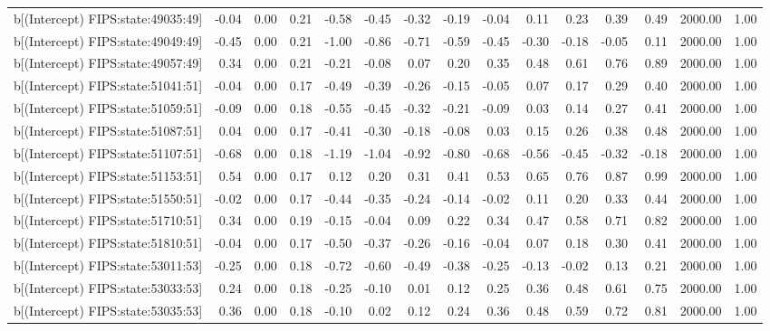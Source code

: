 \begin{table}[ht]
\begin{tabular}{rrrrrrrrrrrrrrr}
  b[(Intercept) FIPS:state:49035:49] & -0.04 & 0.00 & 0.21 & -0.58 & -0.45 & -0.32 & -0.19 & -0.04 & 0.11 & 0.23 & 0.39 & 0.49 & 2000.00 & 1.00 \\ 
  b[(Intercept) FIPS:state:49049:49] & -0.45 & 0.00 & 0.21 & -1.00 & -0.86 & -0.71 & -0.59 & -0.45 & -0.30 & -0.18 & -0.05 & 0.11 & 2000.00 & 1.00 \\ 
  b[(Intercept) FIPS:state:49057:49] & 0.34 & 0.00 & 0.21 & -0.21 & -0.08 & 0.07 & 0.20 & 0.35 & 0.48 & 0.61 & 0.76 & 0.89 & 2000.00 & 1.00 \\ 
  b[(Intercept) FIPS:state:51041:51] & -0.04 & 0.00 & 0.17 & -0.49 & -0.39 & -0.26 & -0.15 & -0.05 & 0.07 & 0.17 & 0.29 & 0.40 & 2000.00 & 1.00 \\ 
  b[(Intercept) FIPS:state:51059:51] & -0.09 & 0.00 & 0.18 & -0.55 & -0.45 & -0.32 & -0.21 & -0.09 & 0.03 & 0.14 & 0.27 & 0.41 & 2000.00 & 1.00 \\ 
  b[(Intercept) FIPS:state:51087:51] & 0.04 & 0.00 & 0.17 & -0.41 & -0.30 & -0.18 & -0.08 & 0.03 & 0.15 & 0.26 & 0.38 & 0.48 & 2000.00 & 1.00 \\ 
  b[(Intercept) FIPS:state:51107:51] & -0.68 & 0.00 & 0.18 & -1.19 & -1.04 & -0.92 & -0.80 & -0.68 & -0.56 & -0.45 & -0.32 & -0.18 & 2000.00 & 1.00 \\ 
  b[(Intercept) FIPS:state:51153:51] & 0.54 & 0.00 & 0.17 & 0.12 & 0.20 & 0.31 & 0.41 & 0.53 & 0.65 & 0.76 & 0.87 & 0.99 & 2000.00 & 1.00 \\ 
  b[(Intercept) FIPS:state:51550:51] & -0.02 & 0.00 & 0.17 & -0.44 & -0.35 & -0.24 & -0.14 & -0.02 & 0.11 & 0.20 & 0.33 & 0.44 & 2000.00 & 1.00 \\ 
  b[(Intercept) FIPS:state:51710:51] & 0.34 & 0.00 & 0.19 & -0.15 & -0.04 & 0.09 & 0.22 & 0.34 & 0.47 & 0.58 & 0.71 & 0.82 & 2000.00 & 1.00 \\ 
  b[(Intercept) FIPS:state:51810:51] & -0.04 & 0.00 & 0.17 & -0.50 & -0.37 & -0.26 & -0.16 & -0.04 & 0.07 & 0.18 & 0.30 & 0.41 & 2000.00 & 1.00 \\ 
  b[(Intercept) FIPS:state:53011:53] & -0.25 & 0.00 & 0.18 & -0.72 & -0.60 & -0.49 & -0.38 & -0.25 & -0.13 & -0.02 & 0.13 & 0.21 & 2000.00 & 1.00 \\ 
  b[(Intercept) FIPS:state:53033:53] & 0.24 & 0.00 & 0.18 & -0.25 & -0.10 & 0.01 & 0.12 & 0.25 & 0.36 & 0.48 & 0.61 & 0.75 & 2000.00 & 1.00 \\ 
  b[(Intercept) FIPS:state:53035:53] & 0.36 & 0.00 & 0.18 & -0.10 & 0.02 & 0.12 & 0.24 & 0.36 & 0.48 & 0.59 & 0.72 & 0.81 & 2000.00 & 1.00 \\ 

\end{tabular}
\end{table}

